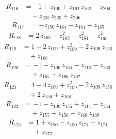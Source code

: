 \begin{equation*}\begin{aligned}
R_{116}&=-1 +z_{109} +z_{161}\,z_{162} -z_{204} \\
&\quad -z_{205}\,z_{220} +z_{206}
\end{aligned}\end{equation*}
\begin{equation*}\begin{aligned}
R_{117}&=-z_{150}\,z_{164} -z_{164} +z_{165}
\end{aligned}\end{equation*}
\begin{equation*}\begin{aligned}
R_{118}&=2\,z_{163} +z_{163}^{2} +z_{164}^{2} -z_{165}^{2}
\end{aligned}\end{equation*}
\begin{equation*}\begin{aligned}
R_{119}&=1 -2\,z_{109} +z_{109}^{2} -2\,z_{109}\,z_{150} \\
&\quad +z_{166}
\end{aligned}\end{equation*}
\begin{equation*}\begin{aligned}
R_{120}&=-1 -z_{109}\,z_{164} +z_{110} -z_{163} \\
&\quad +z_{165} +z_{166}\,z_{167}
\end{aligned}\end{equation*}
\begin{equation*}\begin{aligned}
R_{121}&=4 -4\,z_{109} +z_{109}^{2} -2\,z_{109}\,z_{150} \\
&\quad +2\,z_{150} +z_{168}
\end{aligned}\end{equation*}
\begin{equation*}\begin{aligned}
R_{122}&=-1 -z_{109}\,z_{155} +z_{111} -z_{154} \\
&\quad +z_{155} +z_{156} +z_{168}\,z_{169}
\end{aligned}\end{equation*}
\begin{equation*}\begin{aligned}
R_{123}&=1 +z_{150} -z_{150}\,z_{171} -z_{171} \\
&\quad +z_{172}
\end{aligned}\end{equation*}
